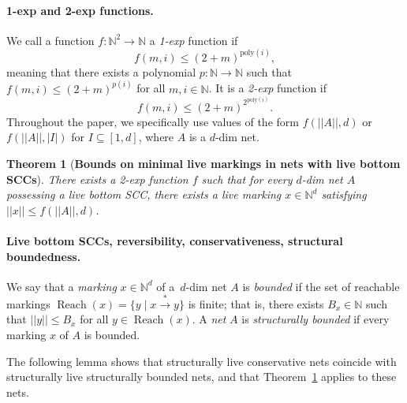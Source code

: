 \documentclass[11pt,a4paper]{amsart}
\DeclareMathOperator{\Reach}{Reach}
\newcommand{\step}[1]{\mathrel{\xrightarrow{#1}}}
\newcommand{\reach}{\step{*}}
\newcommand{\nnorm}[1]{||#1||}
\newcommand{\Nat}{\mathbb{N}}
\newcommand{\setN}{\Nat}
\theoremstyle{plain}
\newtheorem{thm}{Theorem}[section]
\theoremstyle{definition}
\theoremstyle{defC}
\theoremstyle{thmC}
\begin{document}
\paragraph{1-exp and 2-exp functions.}
We call a function $f\colon\setN^2\to\setN$ 
a \emph{1-exp} function if 
\[f(m,i)\leq (2+m)^{\text{poly}(i)},\]
meaning that there exists a polynomial $p\colon\setN\to\setN$
such that 
$f(m,i)\leq (2+m)^{p(i)}$ for all $m,i\in\setN$.
It is a \emph{2-exp} function if 
\[f(m,i)\leq (2+m)^{2^{\text{poly}(i)}}.\]
Throughout the paper, we specifically use values of the form $f(\nnorm{A},d)$ or 
$f(\nnorm{A},|I|)$ for $I\subseteq[1,d]$, where $A$ is a $d$-dim net.


\begin{thm}[\textbf{Bounds on minimal live markings in 
	nets with live bottom SCCs}]\label{th:upper}
	There exists a 2-exp function $f$ such that 
	for every $d$-dim net $A$ possessing a live bottom SCC, 
	there exists a live marking
	$x\in\setN^d$
	satisfying $\nnorm{x}\leq f(\nnorm{A},d)$.
\end{thm}


\paragraph{Live bottom SCCs, reversibility, conservativeness,
	structural boundedness.}
 We say that a \emph{marking} $x\in\setN^d$ of a~$d$-dim net $A$ is
 \emph{bounded} if the set of reachable markings $\Reach(x)=\{y\mid
 x\reach y\}$ is finite; that is, 
 there exists $B_x\in\setN$ such that $\nnorm{y}\leq B_x$ for
 all $y\in\Reach(x)$. A \emph{net} $A$ is \emph{structurally
 bounded} if every marking $x$ of $A$ is bounded.

The following lemma shows that structurally live conservative nets coincide
	with structurally live structurally bounded nets, and that 
	Theorem~\ref{th:upper} applies to these nets.
\end{document}
